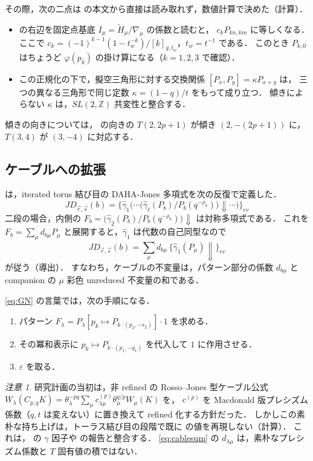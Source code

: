 \documentclass[11pt,a4paper]{ltjsarticle}
\theoremstyle{definition}
\theoremstyle{remark}
\newtheorem{remark}[proposition]{注意}
\begin{document}
その際，次の二点は \cite{GN} の本文から直接は読み取れず，数値計算で決めた（計算）．
\begin{itemize}
\item \cite[\S4]{GN} の右辺を固定点基底 $I_\mu=\widetilde H_\mu/\nabla_\mu$ の係数と読むと，
  $c_k P_{kn,km}$ に等しくなる．ここで $c_k=(-1)^{k-1}(1-t_w^{-k})/[k]_{q,t_w}$，$t_w=t^{-1}$ である．
  このとき $P_{k,0}$ はちょうど $\varphi(p_k)$ の掛け算になる（$k=1,2,3$ で確認）．
\item この正規化の下で，擬空三角形に対する交換関係 $[P_x,P_y]=\kappa P_{x+y}$ は，
  三つの異なる三角形で同じ定数 $\kappa=(1-q)/t$ をもって成り立つ．
  傾きによらない $\kappa$ は，$SL(2,\mathbb{Z})$ 共変性と整合する．
\end{itemize}
傾きの向きについては，\cite{DGR} の向きの $T(2,2p+1)$ が傾き $(2,-(2p+1))$ に，$T(3,4)$ が $(3,-4)$ に対応する．

\subsection{ケーブルへの拡張}

\cite[(2.12)]{CD14} は，iterated torus 結び目の DAHA-Jones 多項式を次の反復で定義した．
\[
JD_{\vec r,\vec s}(b)=\Big\{\hat\gamma_1\Big(\cdots\big(\hat\gamma_\ell(P_b)/P_b(q^{-\rho_k})\big)\Downarrow\cdots\Big)\Big\}_{ev}
\]
二段の場合，内側の $F_b=\big(\hat\gamma_2(P_b)/P_b(q^{-\rho_k})\big)\Downarrow$ は対称多項式である．
これを $F_b=\sum_\mu d_{b\mu}P_\mu$ と展開すると，$\hat\gamma_1$ は代数の自己同型なので
\begin{equation}\label{eq:cablesum}
JD_{\vec r,\vec s}(b)=\sum_\mu d_{b\mu}\,\big\{\hat\gamma_1(P_\mu)\Downarrow\big\}_{ev}
\end{equation}
が従う（導出）．
すなわち，ケーブルの不変量は，パターン部分の係数 $d_{b\mu}$ と companion の $\mu$ 彩色 unreduced 不変量の和である．

\eqref{eq:GN} の言葉では，次の手順になる．
\begin{enumerate}
\item パターン $F_\lambda=P_\lambda[p_k\mapsto P_{k\cdot(p_2,-s_2)}]\cdot1$ を求める．
\item その冪和表示に $p_k\mapsto P_{k\cdot(p_1,-q_1)}$ を代入して $1$ に作用させる．
\item $\varepsilon$ を取る．
\end{enumerate}

\begin{remark}
研究計画の当初は，非 refined の Rosso--Jones 型ケーブル公式
$W_\lambda(C_{p,q}K)=\theta_\lambda^{-pq}\sum_\mu c^{(p)}_{\lambda\mu}\theta_\mu^{q/p}W_\mu(K)$ を，
$c^{(p)}$ を Macdonald 版プレシズム係数（$q,t$ は変えない）に置き換えて refined 化する方針だった．
しかしこの素朴な持ち上げは，トーラス結び目の段階で既に \cite{KN} の値を再現しない（計算）．
これは，\cite{DMMSS,MMSS} の $\gamma$ 因子や \cite{Dan,Mo18} の報告と整合する．
\eqref{eq:cablesum} の $d_{\lambda\mu}$ は，素朴なプレシズム係数と $T$ 固有値の積ではない．
\end{remark}
\end{document}
